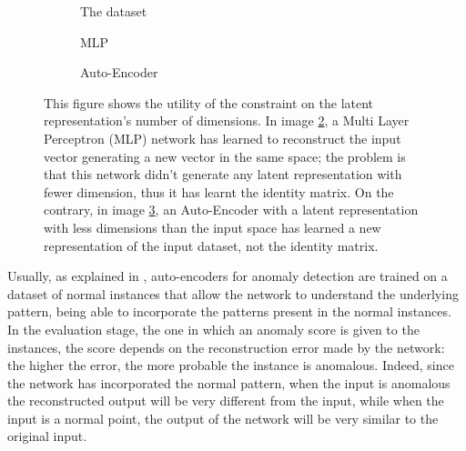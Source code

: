 \begin{figure}[tb]
     \centering
     \begin{subfigure}[b]{0.3\textwidth}
         \centering
        
         \caption{The dataset}
         \label{subfig:ds}
     \end{subfigure}
     \hfill
     \begin{subfigure}[b]{0.3\textwidth}
         \centering
        
         \caption{MLP}
         \label{subfig:mlp}
     \end{subfigure}
     \hfill
     \begin{subfigure}[b]{0.3\textwidth}
         \centering
         
         \caption{Auto-Encoder}
         \label{subfig:ae1}
     \end{subfigure}
     \caption{This figure shows the utility of the constraint on the latent representation's number of dimensions. In image \ref{subfig:mlp}, a Multi Layer Perceptron (MLP) network has learned to reconstruct the input vector generating a new vector in the same space; the problem is that this network didn't generate any latent representation with fewer dimension, thus it has learnt the identity matrix. On the contrary, in image \ref{subfig:ae1}, an Auto-Encoder with a latent representation with less dimensions than the input space has learned a new representation of the input dataset, not the identity matrix.}
     \label{fig:ae_constraint}
\end{figure}

Usually, as explained in \cite{ae_anom_detect}, auto-encoders for anomaly detection are trained on a dataset of normal instances that allow the network to understand the underlying pattern, being able to incorporate the patterns present in the normal instances. In the evaluation stage, the one in which an anomaly score is given to the instances, the score depends on the reconstruction error made by the network: the higher the error, the more probable the instance is anomalous. Indeed, since the network has incorporated the normal pattern, when the input is anomalous the reconstructed output will be very different from the input, while when the input is a normal point, the output of the network will be very similar to the original input. 

